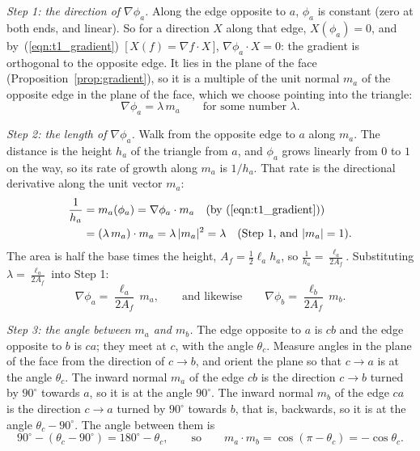 \emph{Step 1: the direction of $\nabla\phi_a$.} Along the edge opposite to $a$, $\phi_a$ is constant (zero at both ends, and linear). So for a direction $X$ along that edge, $X(\phi_a) = 0$, and by~(\ref{eqn:t1_gradient})~[\,$X(f) = \nabla f\cdot X$\,], $\nabla\phi_a\cdot X = 0$: the gradient is orthogonal to the opposite edge. It lies in the plane of the face (Proposition~\ref{prop:gradient}), so it is a multiple of the unit normal $m_a$ of the opposite edge in the plane of the face, which we choose pointing into the triangle:
\begin{equation*}
\nabla\phi_a = \lambda\, m_a \qquad \text{for some number } \lambda .
\end{equation*}

\emph{Step 2: the length of $\nabla\phi_a$.} Walk from the opposite edge to $a$ along $m_a$. The distance is the height $h_a$ of the triangle from $a$, and $\phi_a$ grows linearly from $0$ to $1$ on the way, so its rate of growth along $m_a$ is $1/h_a$. That rate is the directional derivative along the unit vector $m_a$:
\begin{align*}
\frac{1}{h_a} &= m_a(\phi_a) = \nabla\phi_a\cdot m_a \quad \text{(by~(\ref{eqn:t1_gradient}))}\\
&= (\lambda\, m_a)\cdot m_a = \lambda\, |m_a|^2 = \lambda \quad \text{(Step 1, and } |m_a| = 1\text{)} .
\end{align*}
The area is half the base times the height, $A_f = \frac12 \ell_a h_a$, so $\frac{1}{h_a} = \frac{\ell_a}{2A_f}$. Substituting $\lambda = \frac{\ell_a}{2A_f}$ into Step 1:
\begin{equation*}
\nabla \phi_a = \frac{\ell_a}{2 A_f}\, m_a , \qquad \text{and likewise} \qquad \nabla \phi_b = \frac{\ell_b}{2 A_f}\, m_b .
\end{equation*}

\emph{Step 3: the angle between $m_a$ and $m_b$.} The edge opposite to $a$ is $cb$ and the edge opposite to $b$ is $ca$; they meet at $c$, with the angle $\theta_c$. Measure angles in the plane of the face from the direction of $c \to b$, and orient the plane so that $c \to a$ is at the angle $\theta_c$. The inward normal $m_a$ of the edge $cb$ is the direction $c\to b$ turned by $90^\circ$ towards $a$, so it is at the angle $90^\circ$. The inward normal $m_b$ of the edge $ca$ is the direction $c\to a$ turned by $90^\circ$ towards $b$, that is, backwards, so it is at the angle $\theta_c - 90^\circ$. The angle between them is
\begin{equation*}
90^\circ - (\theta_c - 90^\circ) = 180^\circ - \theta_c, \qquad \text{so} \qquad m_a\cdot m_b = \cos(\pi - \theta_c) = -\cos\theta_c .
\end{equation*}

